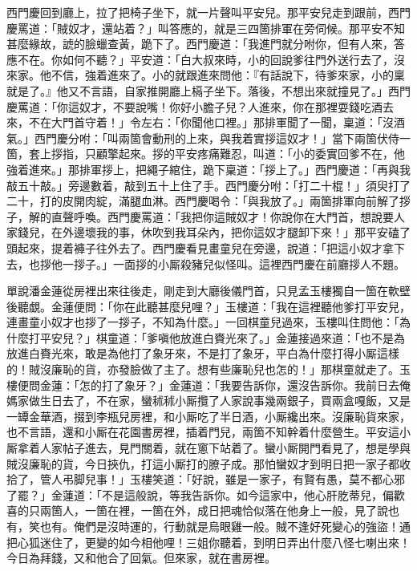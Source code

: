 西門慶回到廳上，拉了把椅子坐下，就一片聲叫平安兒。那平安兒走到跟前，西門慶罵道：「賊奴才，還站着？」叫答應的，就是三四箇排軍在旁伺候。那平安不知甚麼緣故，諕的臉蠟查黃，跪下了。西門慶道：「我進門就分咐你，但有人來，答應不在。你如何不聽？」平安道：「白大叔來時，小的回說爹往門外送行去了，沒來家。他不信，強着進來了。小的就跟進來問他：『有話說下，待爹來家，小的稟就是了。』他又不言語，自家推開廳上槅子坐下。落後，不想出來就撞見了。」西門慶罵道：「你這奴才，不要說嘴！你好小膽子兒？人進來，你在那裡耍錢吃酒去來，不在大門首守着！」令左右：「你聞他口裡。」那排軍聞了一聞，稟道：「沒酒氣。」西門慶分咐：「叫兩箇會動刑的上來，與我着實拶這奴才！」當下兩箇伏侍一箇，套上拶指，只顧擎起來。拶的平安疼痛難忍，叫道：「小的委實回爹不在，他強着進來。」那排軍拶上，把繩子綰住，跪下稟道：「拶上了。」西門慶道：「再與我敲五十敲。」旁邊數着，敲到五十上住了手。西門慶分咐：「打二十棍！」須臾打了二十，打的皮開肉綻，滿腿血淋。西門慶喝令：「與我放了。」兩箇排軍向前解了拶子，解的直聲呼喚。西門慶罵道：「我把你這賊奴才！你說你在大門首，想說要人家錢兒，在外邊壞我的事，休吹到我耳朵內，把你這奴才腿卸下來！」那平安磕了頭起來，提着褲子往外去了。西門慶看見畫童兒在旁邊，說道：「把這小奴才拿下去，也拶他一拶子。」一面拶的小厮殺豬兒似怪叫。這裡西門慶在前廳拶人不題。

單說潘金蓮從房裡出來往後走，剛走到大廳後儀門首，只見孟玉樓獨自一箇在軟壁後聽覷。金蓮便問：「你在此聽甚麼兒哩？」玉樓道：「我在這裡聽他爹打平安兒，連畫童小奴才也拶了一拶子，不知為什麼。」一回棋童兒過來，玉樓叫住問他：「為什麼打平安兒？」棋童道：「爹嗔他放進白賚光來了。」金蓮接過來道：「也不是為放進白賚光來，敢是為他打了象牙來，不是打了象牙，平白為什麼打得小厮這樣的！賊沒廉恥的貨，亦發臉做了主了。想有些廉恥兒也怎的！」那棋童就走了。玉樓便問金蓮：「怎的打了象牙？」金蓮道：「我要告訴你，還沒告訴你。我前日去俺媽家做生日去了，不在家，蠻秫秫小厮攬了人家說事幾兩銀子，買兩盒嘎飯，又是一罈金華酒，掇到李瓶兒房裡，和小厮吃了半日酒，小厮纔出來。沒廉恥貨來家，也不言語，還和小厮在花園書房裡，插着門兒，兩箇不知幹着什麼營生。平安這小厮拿着人家帖子進去，見門關着，就在窻下站着了。蠻小厮開門看見了，想是學與賊沒廉恥的貨，今日挾仇，打這小厮打的膫子成。那怕蠻奴才到明日把一家子都收拾了，管人弔脚兒事！」玉樓笑道：「好說，雖是一家子，有賢有愚，{}莫不都心邪了罷？」金蓮道：「不是這般說，等我告訴你。如今這家中，他心肝肐蒂兒，偏歡喜的只兩箇人，一箇在裡，一箇在外，成日把魂恰似落在他身上一般，見了說也有，笑也有。俺們是沒時運的，行動就是烏眼雞一般。賊不逢好死變心的強盜！通把心狐迷住了，更變的如今相他哩！三姐你聽着，到明日弄出什麼八怪七喇出來！今日為拜錢，又和他合了回氣。但來家，就在書房裡。

